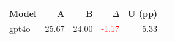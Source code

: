 \begin{tabular}{lrrrrr}
\toprule
Model & A & B & $\Delta$ & U (pp) \\
\midrule
gpt4o & 25.67 & 24.00 & \textcolor{red}{-1.17} & \cellcolor{blue!10} 5.33 \\
\bottomrule
\end{tabular}